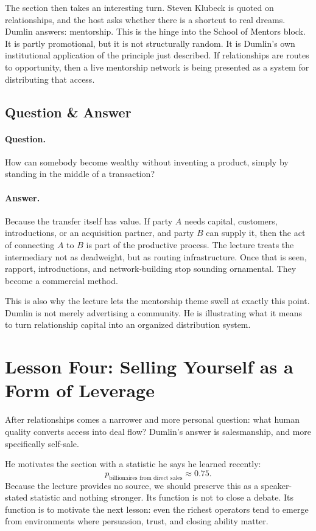 The section then takes an interesting turn. Steven Klubeck is quoted on relationships, and the host asks whether there is a shortcut to real dreams. Dumlin answers: mentorship. This is the hinge into the School of Mentors block. It is partly promotional, but it is not structurally random. It is Dumlin's own institutional application of the principle just described. If relationships are routes to opportunity, then a live mentorship network is being presented as a system for distributing that access.

\subsection{Question \& Answer}

\paragraph{Question.} How can somebody become wealthy without inventing a product, simply by standing in the middle of a transaction?

\paragraph{Answer.} Because the transfer itself has value. If party \(A\) needs capital, customers, introductions, or an acquisition partner, and party \(B\) can supply it, then the act of connecting \(A\) to \(B\) is part of the productive process. The lecture treats the intermediary not as deadweight, but as routing infrastructure. Once that is seen, rapport, introductions, and network-building stop sounding ornamental. They become a commercial method.

This is also why the lecture lets the mentorship theme swell at exactly this point. Dumlin is not merely advertising a community. He is illustrating what it means to turn relationship capital into an organized distribution system.

\section{Lesson Four: Selling Yourself as a Form of Leverage}

After relationships comes a narrower and more personal question: what human quality converts access into deal flow? Dumlin's answer is salesmanship, and more specifically self-sale.

He motivates the section with a statistic he says he learned recently:
\begin{equation}
p_{\text{billionaires from direct sales}} \approx 0.75.
\end{equation}
Because the lecture provides no source, we should preserve this as a speaker-stated statistic and nothing stronger. Its function is not to close a debate. Its function is to motivate the next lesson: even the richest operators tend to emerge from environments where persuasion, trust, and closing ability matter.

